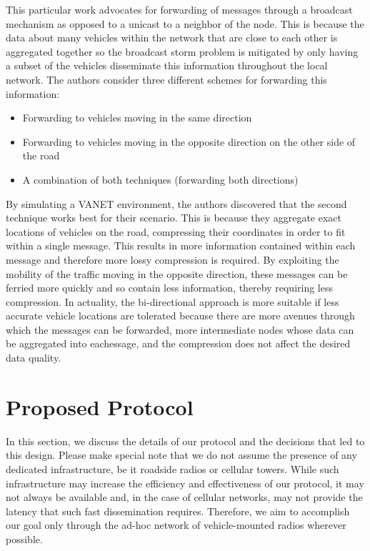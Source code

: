 \documentclass{IEEEtran}
\begin{document}
This particular work advocates for forwarding of messages through a broadcast mechanism as opposed to a unicast to a neighbor of the node.  This is because the data about many vehicles within the network that are close to each other is aggregated together so the broadcast storm problem is mitigated by only having a subset of the vehicles disseminate this information throughout the local network.  The authors consider three different schemes for forwarding this information:

\begin{itemize}
\item Forwarding to vehicles moving in the same direction
\item Forwarding to vehicles moving in the opposite direction on the other side of the road
\item A combination of both techniques (forwarding both directions)
\end{itemize}

By simulating a VANET environment,  the authors discovered that the second technique works best for their scenario.  This is because they aggregate exact locations of vehicles on the road, compressing their coordinates in order to fit within a single message.  This results in more information contained within each message and therefore more lossy compression is required.  By exploiting the mobility of the traffic moving in the opposite direction, these messages can be ferried more quickly and so contain less information, thereby requiring less compression.  In actuality, the bi-directional approach is more suitable if less accurate vehicle locations are tolerated because there are more avenues through which the messages can be forwarded, more intermediate nodes whose data can be aggregated into eachessage, and the compression does not affect the desired data quality.

\section{Proposed Protocol}

In this section, we discuss the details of our protocol and the decisions that led to this design.
Please make special note that we do not assume the presence of any dedicated infrastructure, be it roadside radios or cellular towers.
While such infrastructure may increase the efficiency and effectiveness of our protocol, it may not always be available and, in the case of cellular networks, may not provide the latency that such fast dissemination requires.
Therefore, we aim to accomplish our goal only through the ad-hoc network of vehicle-mounted radios wherever possible.
\end{document}
